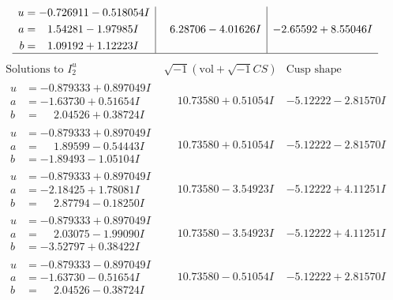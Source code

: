 \documentclass[1p]{elsarticle_modified}
\theoremstyle{definition}
\newcommand{\I}{\sqrt{-1}}
\begin{document}
$$\begin{array}{c|c|c}
\begin{aligned}
u &= -0.726911 - 0.518054 I \\
a &= \phantom{-}1.54281 - 1.97985 I \\
b &= \phantom{-}1.09192 + 1.12223 I\end{aligned}
 & \phantom{-}6.28706 - 4.01626 I & -2.65592 + 8.55046 I\\
 \hline 
 \end{array}$$\newpage$$\begin{array}{c|c|c}  
\text{Solutions to }I^u_{2}& \I (\text{vol} + \sqrt{-1}CS) & \text{Cusp shape}\\
 \hline 
\begin{aligned}
u &= -0.879333 + 0.897049 I \\
a &= -1.63730 + 0.51654 I \\
b &= \phantom{-}2.04526 + 0.38724 I\end{aligned}
 & \phantom{-}10.73580 + 0.51054 I & -5.12222 - 2.81570 I \\ \hline\begin{aligned}
u &= -0.879333 + 0.897049 I \\
a &= \phantom{-}1.89599 - 0.54443 I \\
b &= -1.89493 - 1.05104 I\end{aligned}
 & \phantom{-}10.73580 + 0.51054 I & -5.12222 - 2.81570 I \\ \hline\begin{aligned}
u &= -0.879333 + 0.897049 I \\
a &= -2.18425 + 1.78081 I \\
b &= \phantom{-}2.87794 - 0.18250 I\end{aligned}
 & \phantom{-}10.73580 - 3.54923 I & -5.12222 + 4.11251 I \\ \hline\begin{aligned}
u &= -0.879333 + 0.897049 I \\
a &= \phantom{-}2.03075 - 1.99090 I \\
b &= -3.52797 + 0.38422 I\end{aligned}
 & \phantom{-}10.73580 - 3.54923 I & -5.12222 + 4.11251 I \\ \hline\begin{aligned}
u &= -0.879333 - 0.897049 I \\
a &= -1.63730 - 0.51654 I \\
b &= \phantom{-}2.04526 - 0.38724 I\end{aligned}
 & \phantom{-}10.73580 - 0.51054 I & -5.12222 + 2.81570 I \\ \hline\begin{aligned}

\end{aligned}
\end{array}$$
\end{document}

